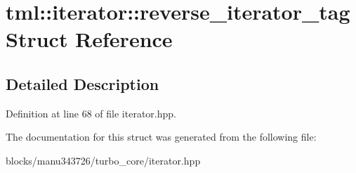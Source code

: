 \hypertarget{structtml_1_1iterator_1_1reverse__iterator__tag}{\section{tml\+:\+:iterator\+:\+:reverse\+\_\+iterator\+\_\+tag Struct Reference}
\label{structtml_1_1iterator_1_1reverse__iterator__tag}
}


\subsection{Detailed Description}


Definition at line 68 of file iterator.\+hpp.



The documentation for this struct was generated from the following file\+:\begin{DoxyCompactItemize}
\item 
blocks/manu343726/turbo\+\_\+core/iterator.\+hpp\end{DoxyCompactItemize}
